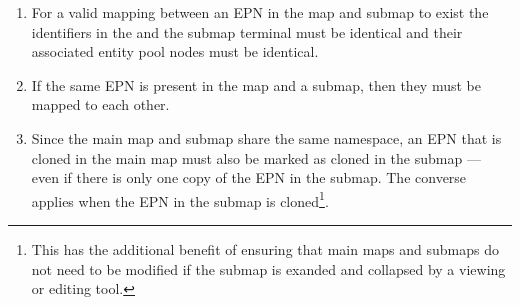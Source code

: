 \begin{enumerate}
\item For a valid mapping between an EPN in the map and submap to exist the identifiers in the  and the submap terminal must be identical and their associated entity pool nodes must be identical.
\item If the same EPN is present in the map and a submap, then they must be mapped to each other.
\item Since the main map and submap share the same namespace, an EPN that is cloned in the main map must also be
marked as cloned in the submap --- even if there is only one copy of the EPN in the submap. The converse applies when the EPN in the submap is cloned\footnote{This has the additional benefit of ensuring that main maps and submaps do not need to be modified if the submap is exanded and collapsed by a viewing or editing tool.}.
\end{enumerate}




